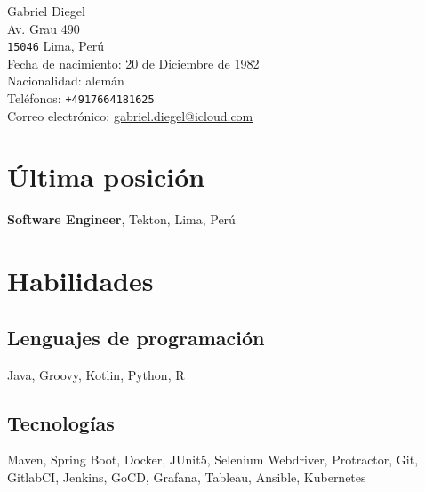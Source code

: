 \documentclass[10pt, a4paper]{article}
\begin{document}
{\LARGE Gabriel Diegel}\\[1cm]
Av. Grau 490\\
\texttt{15046} Lima, Perú\\[.2cm]
Fecha de nacimiento: 20 de Diciembre de 1982\\
Nacionalidad: alemán\\[.2cm]
Teléfonos: \texttt{+4917664181625}\\
Correo electrónico: \href{mailto:gabriel.diegel@icloud.com}{gabriel.diegel@icloud.com}\\

\section*{Última posición}
{\bf Software Engineer}, Tekton, Lima, Perú

\section*{Habilidades}
\subsection*{Lenguajes de programación}
Java, Groovy, Kotlin, Python, R
\subsection*{Tecnologías}
Maven, Spring Boot, Docker, JUnit5, Selenium Webdriver, Protractor, Git, GitlabCI, Jenkins, GoCD, Grafana, Tableau, Ansible, Kubernetes

\end{document}
